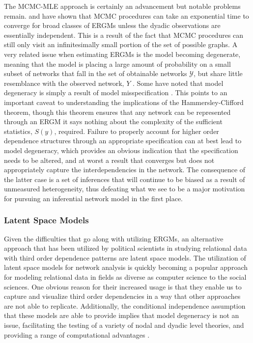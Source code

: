 The MCMC-MLE approach is certainly an advancement but notable problems remain. \citet{bhamidi:etal:2008} and \citet{chatterjee:diaconis:2013} have shown that MCMC procedures can take an exponential time to converge for broad classes of ERGMs unless the dyadic observations are essentially independent. This is a result of the fact that MCMC procedures can still only visit an infinitesimally small portion of the set of possible graphs. A very related issue when estimating ERGMs is the model becoming degenerate, meaning that the model is placing a large amount of probability on a small subset of networks that fall in the set of obtainable networks $\mathcal{Y}$, but share little resemblance with the observed network, $Y$ \citep{schweinberger:2011}. Some have noted that model degeneracy is simply a result of model misspecification \citep{handcock:2003b,goodreau:etal:2008,handcock:etal:2008}. This points to an important caveat to understanding the implications of the Hammersley-Clifford theorem, though this theorem ensures that any network can be represented through an ERGM it says nothing about the complexity of the sufficient statistics, $S(y)$, required. Failure to properly account for higher order dependence structures through an appropriate specification can at best lead to model degeneracy, which provides an obvious indication that the specification needs to be altered, and at worst a result that converges but does not appropriately capture the interdependencies in the network. The consequence of the latter case is a set of inferences that will continue to be biased as a result of unmeasured heterogeneity, thus defeating what we see to be a major motivation for pursuing an inferential network model in the first place. 

\subsubsection{\textbf{Latent Space Models}}

Given the difficulties that go along with utilizing ERGMs, an alternative approach that has been utilized by political scientists in studying relational data with third order dependence patterns are latent space models. The utilization of latent space models for network analysis is quickly becoming a popular approach for modeling relational data in fields as diverse as computer science to the social sciences. One obvious reason for their increased usage is that they enable us to capture and visualize third order dependencies in a way that other approaches are not able to replicate. Additionally, the conditional independence assumption that these models are able to provide implies that model degeneracy is not an issue, facilitating the testing of a variety of nodal and dyadic level theories, and providing a range of computational advantages \citep{hunter:etal:2012}. 

